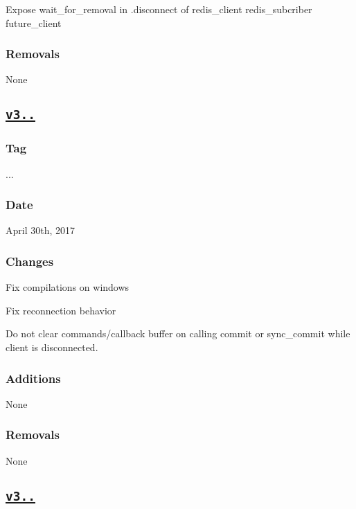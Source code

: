 \begin{DoxyItemize}
\item Expose wait\+\_\+for\+\_\+removal in .disconnect of redis\+\_\+client redis\+\_\+subcriber future\+\_\+client \subsubsection*{Removals}
\end{DoxyItemize}

None

\subsection*{\href{https://github.com/Cylix/cpp_redis/releases/tag/3.5.1}{\tt v3..}}

\subsubsection*{Tag}

{..}. \subsubsection*{Date}

April 30th, 2017 \subsubsection*{Changes}


\begin{DoxyItemize}
\item Fix compilations on windows
\item Fix reconnection behavior
\item Do not clear commands/callback buffer on calling commit or sync\+\_\+commit while client is disconnected. \subsubsection*{Additions}
\end{DoxyItemize}

None \subsubsection*{Removals}

None

\subsection*{\href{https://github.com/Cylix/cpp_redis/releases/tag/3.5.0}{\tt v3..}}

